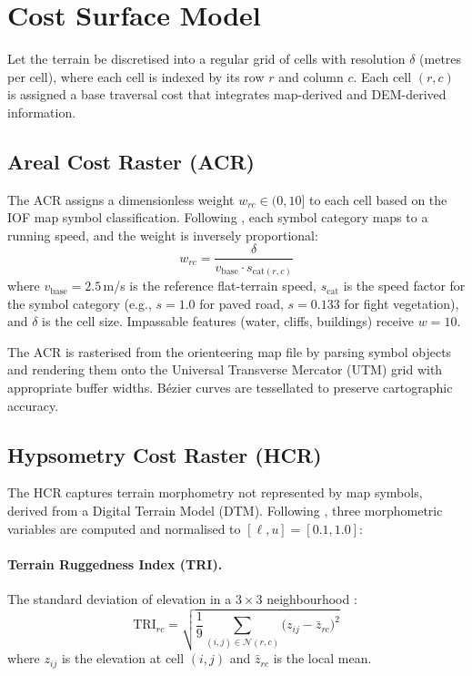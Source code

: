 \documentclass[11pt,a4paper]{article}
\begin{document}
\section{Cost Surface Model}
\label{sec:cost}

Let the terrain be discretised into a regular grid of cells with resolution $\delta$ (metres per cell), where each cell is indexed by its row $r$ and column $c$.
Each cell $(r,c)$ is assigned a base traversal cost that integrates map-derived and DEM-derived information.

\subsection{Areal Cost Raster (ACR)}
\label{sec:acr}

The ACR assigns a dimensionless weight $w_{rc} \in (0, 10]$ to each cell based on the IOF map symbol classification.
Following \citet{ica2021lcp}, each symbol category maps to a running speed, and the weight is inversely proportional:
\begin{equation}
  w_{rc} = \frac{\delta}{v_{\text{base}} \cdot s_{\text{cat}(r,c)}}
  \label{eq:acr}
\end{equation}
where $v_{\text{base}} = 2.5$\,m/s is the reference flat-terrain speed, $s_{\text{cat}}$ is the speed factor for the symbol category (e.g., $s = 1.0$ for paved road, $s = 0.133$ for fight vegetation), and $\delta$ is the cell size.
Impassable features (water, cliffs, buildings) receive $w = 10$.

The ACR is rasterised from the orienteering map file by parsing symbol objects and rendering them onto the Universal Transverse Mercator (UTM) grid with appropriate buffer widths.
B\'{e}zier curves are tessellated to preserve cartographic accuracy.

\subsection{Hypsometry Cost Raster (HCR)}
\label{sec:hcr}

The HCR captures terrain morphometry not represented by map symbols, derived from a Digital Terrain Model (DTM).
Following \citet{ica2021lcp}, three morphometric variables are computed and normalised to $[\ell, u] = [0.1, 1.0]$:

\paragraph{Terrain Ruggedness Index (TRI).}
The standard deviation of elevation in a $3 \times 3$ neighbourhood \citep{riley1999tri}:
\begin{equation}
  \text{TRI}_{rc} = \sqrt{\frac{1}{9}\sum_{(i,j) \in \mathcal{N}(r,c)} \bigl(z_{ij} - \bar{z}_{rc}\bigr)^2}
  \label{eq:tri}
\end{equation}
where $z_{ij}$ is the elevation at cell $(i,j)$ and $\bar{z}_{rc}$ is the local mean.
\end{document}
